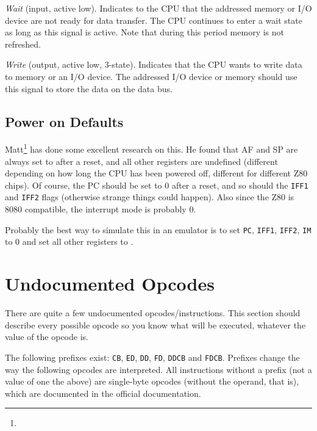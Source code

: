 \begin{description}[leftmargin=1.5em]
	\item[$\mathtt{\overline{WAIT}}$]
	{\em Wait} (input, active low). Indicates to the CPU that the addressed memory or I/O device are not ready for data transfer. The CPU continues to enter a wait state as long as this signal is active. Note that during this period memory is not refreshed.

	\item[$\mathtt{\overline{WR}}$]
	{\em Write} (output, active low, 3-state). Indicates that the CPU wants to write data to memory or an I/O device. The addressed I/O device or memory should use this signal to store the data on the data bus.

\end{description}


\subsection{Power on Defaults}
\label{pon}

Matt\footnote{} has done some excellent research on this. He found that AF and SP are always set to  after a reset, and all other registers are undefined (different depending on how long the CPU has been powered off, different for different Z80 chips). Of course, the PC should be set to 0 after a reset, and so should the {\tt IFF1} and {\tt IFF2} flags (otherwise strange things could happen). Also since the Z80 is 8080 compatible, the interrupt mode is probably 0.

Probably the best way to simulate this in an emulator is to set {\tt PC}, {\tt IFF1}, {\tt IFF2}, {\tt IM} to 0 and set all other registers to .


\section{Undocumented Opcodes}

There are quite a few undocumented opcodes/instructions. This section should describe every possible opcode so you know what will be executed, whatever the value of the opcode is.

The following prefixes exist: {\tt CB}, {\tt ED}, {\tt DD}, {\tt FD}, {\tt DDCB} and {\tt FDCB}. Prefixes change the way the following opcodes are interpreted. All instructions without a prefix (not a value of one the above) are single-byte opcodes (without the operand, that is), which are documented in the official documentation.


